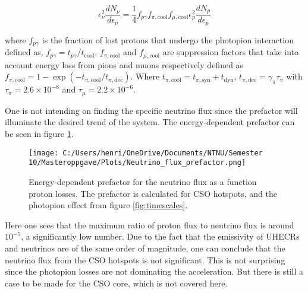 \begin{equation}
\epsilon_{\nu}^2 \frac{dN_{\nu}}{d\epsilon_{\nu}} = \frac{1}{4} f_{p\gamma}f_{\pi, \text{cool}} f_{\mu,\text{cool}}\epsilon_p^2 \frac{dN_{p}}{d\epsilon_{p}}
\end{equation}

where $f_{p\gamma}$ is the fraction of lost protons that undergo the photopion interaction defined as, $f_{p\gamma} = t_{p\gamma}/t_{\text{cool}}$, $f_{\pi, \text{cool}}$ and $f_{\mu, \text{cool}}$ are suppression factors that take into account energy loss from pions and muons respectively defined as $f_{\pi, \text{cool}} = 1-\exp{(-t_{\pi,\text{cool}}/t_{\pi, \text{dec}})}$. Where $t_{\pi,\text{cool}} = t_{\pi, \text{syn}} + t_{\text{dyn}}$, $t_{\pi, \text{dec}} = \gamma_{\pi}\tau_{\pi}$ with $\tau_{\pi} = 2.6\times 10^{-8}$ and $\tau_{\mu} = 2.2\times 10^{-6}$.

One is not intending on finding the specific neutrino flux since the prefactor will illuminate the desired trend of the system. The energy-dependent prefactor can be seen in figure \ref{fig:neutrino_flux_prefactor}.

\begin{figure}
    \centering
    \texttt{[image: C:/Users/henri/OneDrive/Documents/NTNU/Semester 10/Masteroppgave/Plots/Neutrino\_flux\_prefactor.png]}
    \caption{Energy-dependent prefactor for the neutrino flux as a function proton losses. The prefactor is calculated for CSO hotspots, and the photopion effect from figure \ref{fig:timescales}.}
\label{fig:neutrino_flux_prefactor}
\end{figure}

Here one sees that the maximum ratio of proton flux to neutrino flux is around $10^{-5}$, a significantly low number. Due to the fact that the emissivity of UHECRs and neutrinos are of the same order of magnitude, one can conclude that the neutrino flux from the CSO hotspots is not significant. This is not surprising since the photopion losses are not dominating the acceleration. But there is still a case to be made for the CSO core, which is not covered here.

